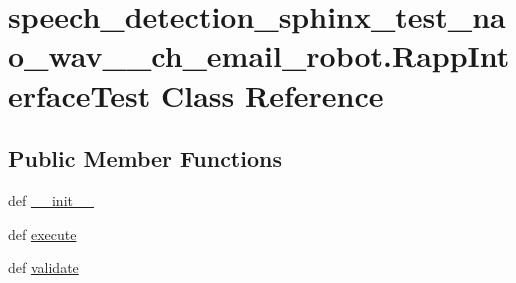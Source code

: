 \hypertarget{classspeech__detection__sphinx__test__nao__wav__1__ch__email__robot_1_1RappInterfaceTest}{\section{speech\-\_\-detection\-\_\-sphinx\-\_\-test\-\_\-nao\-\_\-wav\-\_\-\_\-ch\-\_\-email\-\_\-robot.\-Rapp\-Interface\-Test Class Reference}
\label{classspeech__detection__sphinx__test__nao__wav__1__ch__email__robot_1_1RappInterfaceTest}
}
\subsection*{Public Member Functions}
\begin{DoxyCompactItemize}
\item 
def \hyperlink{classspeech__detection__sphinx__test__nao__wav__1__ch__email__robot_1_1RappInterfaceTest_ae8f82c90ab64bdb06e0ad18dc8aff016}{\-\_\-\-\_\-init\-\_\-\-\_\-}
\item 
def \hyperlink{classspeech__detection__sphinx__test__nao__wav__1__ch__email__robot_1_1RappInterfaceTest_a176c455f0872a03c085e0b27ed47ec56}{execute}
\item 
def \hyperlink{classspeech__detection__sphinx__test__nao__wav__1__ch__email__robot_1_1RappInterfaceTest_aa3d4d30da860ac5eb8a98355e13b757b}{validate}
\end{DoxyCompactItemize}
